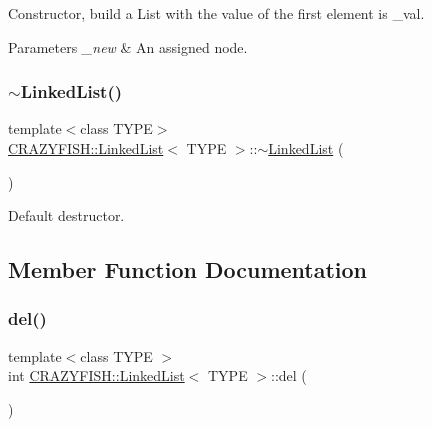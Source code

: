 Constructor, build a List with the value of the first element is \+\_\+val.


\begin{DoxyParams}{Parameters}
{\em \+\_\+new} & An assigned node. \\
\hline
\end{DoxyParams}
\mbox{\label{classCRAZYFISH_1_1LinkedList_a6e2311f3cc0ef21d731e0f17a005eca0}} 
\subsubsection{\texorpdfstring{$\sim$\+Linked\+List()}{~LinkedList()}}
{\footnotesize\ttfamily template$<$class T\+Y\+PE$>$ \\
\hyperlink{classCRAZYFISH_1_1LinkedList}{C\+R\+A\+Z\+Y\+F\+I\+S\+H\+::\+Linked\+List}$<$ T\+Y\+PE $>$\+::$\sim$\hyperlink{classCRAZYFISH_1_1LinkedList}{Linked\+List} (\begin{DoxyParamCaption}{ }\end{DoxyParamCaption})}

Default destructor. 

\subsection{Member Function Documentation}
\mbox{\label{classCRAZYFISH_1_1LinkedList_aed4f2193935fb362eae3d47bb789edee}} 
\subsubsection{\texorpdfstring{del()}{del()}}
{\footnotesize\ttfamily template$<$class T\+Y\+PE $>$ \\
int \hyperlink{classCRAZYFISH_1_1LinkedList}{C\+R\+A\+Z\+Y\+F\+I\+S\+H\+::\+Linked\+List}$<$ T\+Y\+PE $>$\+::del (\begin{DoxyParamCaption}{ }\end{DoxyParamCaption})}


